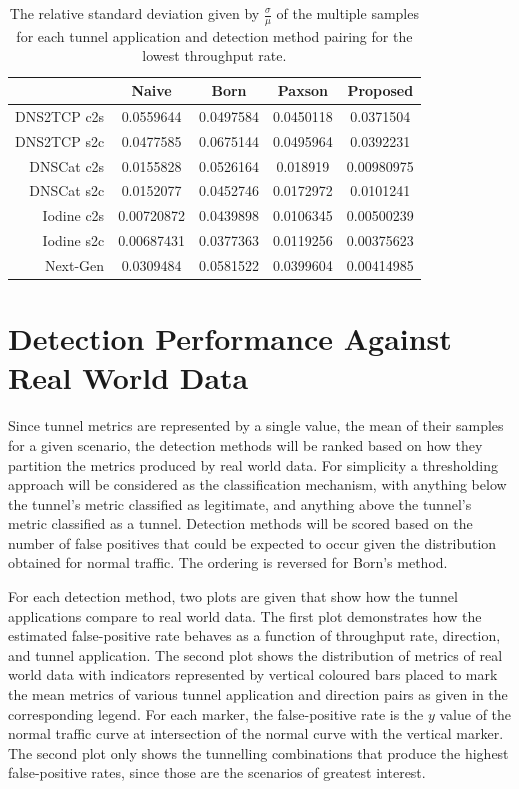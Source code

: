 \documentclass{llncs}
\begin{document}
\begin{table}
\centering
\begin{tabular}{ r|cccc }
& Naive & Born & Paxson & Proposed \\
\hline
DNS2TCP c2s & 0.0559644 & 0.0497584 & 0.0450118 & 0.0371504 \\
DNS2TCP s2c & 0.0477585 & 0.0675144 & 0.0495964 & 0.0392231 \\
DNSCat c2s & 0.0155828 & 0.0526164 & 0.018919 & 0.00980975 \\
DNSCat s2c & 0.0152077 & 0.0452746 & 0.0172972 & 0.0101241 \\
Iodine c2s & 0.00720872 & 0.0439898 & 0.0106345 & 0.00500239 \\
Iodine s2c & 0.00687431 & 0.0377363 & 0.0119256 & 0.00375623 \\
Next-Gen & 0.0309484 & 0.0581522 & 0.0399604 & 0.00414985 \\
\end{tabular}
\caption[Relative Standard Deviation of Lowest Throughput Tunnel by Detection Method and Tunnel Application]{The relative standard deviation given by $\frac{\sigma}{\mu}$ of the multiple samples for each tunnel application and detection method pairing for the lowest throughput rate.}
\label{rsd-minimum}
\end{table}

\section{Detection Performance Against Real World Data}
\label{detection-perf}

Since tunnel metrics are represented by a single value, the mean of their
samples for a given scenario, the detection methods will be ranked based on how
they partition the metrics produced by real world data. For simplicity a
thresholding approach will be considered as the classification mechanism, with
anything below the tunnel's metric classified as legitimate, and anything above
the tunnel's metric classified as a tunnel. Detection methods will be scored
based on the number of false positives that could be expected to occur given the
distribution obtained for normal traffic. The ordering is reversed for Born's method.

For each detection method, two plots are given that show how the tunnel
applications compare to real world data. The first plot demonstrates how the estimated
false-positive rate behaves as a function of throughput rate, direction, and
tunnel application. The second plot shows the distribution of metrics of real
world data with indicators represented by vertical coloured bars placed to mark
the mean metrics of various tunnel application and direction pairs as given in
the corresponding legend. For each marker, the false-positive rate is the $y$
value of the normal traffic curve at intersection of the normal curve with the
vertical marker. The second plot only shows the tunnelling combinations that
produce the highest false-positive rates, since those are the scenarios of
greatest interest.
\end{document}
